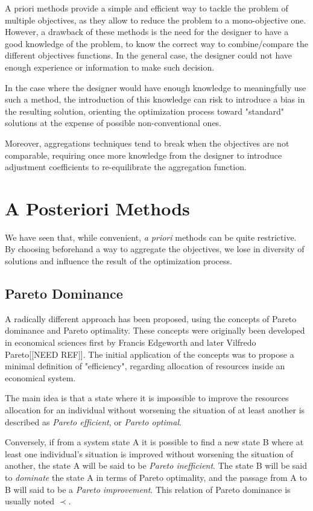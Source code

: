 A priori methods provide a simple and efficient way to tackle the problem of multiple objectives, as they allow to reduce the problem to a mono-objective one.
However, a drawback of these methods is the need for the designer to have a good knowledge of the problem, to know the correct way to combine/compare the different objectives functions. In the general case, the designer could not have enough experience or information to make such decision.

In the case where the designer would have enough knowledge to meaningfully use such a method, the introduction of this knowledge can risk to introduce a bias in the resulting solution, orienting the optimization process toward "standard" solutions at the expense of possible non-conventional ones.

Moreover, aggregations techniques tend to break when the objectives are not comparable, requiring once more knowledge from the designer to introduce adjustment coefficients to re-equilibrate the aggregation function.

\section{A Posteriori Methods}

We have seen that, while convenient, \emph{a priori} methods can be quite restrictive. By choosing beforehand a way to aggregate the objectives, we lose in diversity of solutions and influence the result of the optimization process.

\subsection{Pareto Dominance}

A radically different approach has been proposed, using the concepts of Pareto dominance and Pareto optimality. These concepts were originally been developed in economical sciences first by Francis Edgeworth and later Vilfredo Pareto[[NEED REF]]. The initial application of the concepts was to propose a minimal definition of "efficiency", regarding allocation of resources inside an economical system.

The main idea is that a state where it is impossible to improve the resources allocation for an individual without worsening the situation of at least another is described as \emph{Pareto efficient}, or \emph{Pareto optimal}.

Conversely, if from a system state A it is possible to find a new state B where at least one individual's situation is improved without worsening the situation of another, the state A will be said to be \emph{Pareto inefficient}. The state B will be said to \emph{dominate} the state A in terms of Pareto optimality, and the passage from A to B will said to be a \emph{Pareto improvement}. This relation of Pareto dominance is usually noted \(\prec\).

